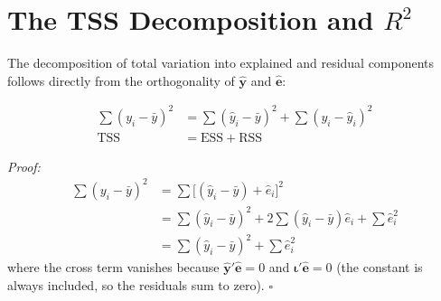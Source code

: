 \section{The TSS Decomposition and $R^2$}
\label{sec_TSS}

The decomposition of total variation into explained and residual components
follows directly from the orthogonality of $\hat{\mathbf{y}}$ and
$\hat{\mathbf{e}}$:

\begin{align*}
  \sum(y_i - \bar{y})^2
  &= \sum(\hat{y}_i - \bar{y})^2 + \sum(y_i - \hat{y}_i)^2 \\
  \text{TSS} &= \text{ESS} + \text{RSS}
\end{align*}

\noindent\textit{Proof:}
\begin{align*}
  \sum(y_i - \bar{y})^2
  &= \sum\bigl[(\hat{y}_i-\bar{y}) + \hat{e}_i\bigr]^2 \\
  &= \sum(\hat{y}_i-\bar{y})^2 + 2\sum(\hat{y}_i-\bar{y})\hat{e}_i
     + \sum\hat{e}_i^2 \\
  &= \sum(\hat{y}_i-\bar{y})^2 + \sum\hat{e}_i^2
\end{align*}
where the cross term vanishes because $\hat{\mathbf{y}}'\hat{\mathbf{e}} = 0$
and $\boldsymbol{\iota}'\hat{\mathbf{e}} = 0$ (the constant is always
included, so the residuals sum to zero). $\square$

\renewcommand\bibname{Further reading}
\begin{subappendices}


\end{subappendices}
